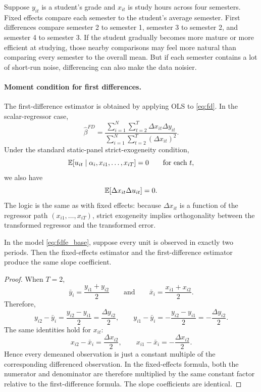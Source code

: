 \begin{exmp}
\label{ex:fd_fe_intuition}
Suppose $y_{it}$ is a student's grade and $x_{it}$ is study hours across four semesters. Fixed effects compare each semester to the student's average semester. First differences compare semester 2 to semester 1, semester 3 to semester 2, and semester 4 to semester 3. If the student gradually becomes more mature or more efficient at studying, those nearby comparisons may feel more natural than comparing every semester to the overall mean. But if each semester contains a lot of short-run noise, differencing can also make the data noisier.
\end{exmp}

\paragraph{Moment condition for first differences.}
The first-difference estimator is obtained by applying \ac{OLS} to \eqref{eq:fd}. In the scalar-regressor case,
\begin{equation}
\hat{\beta}^{FD}
=
\frac{\sum_{i=1}^N \sum_{t=2}^T \Delta x_{it}\Delta y_{it}}
{\sum_{i=1}^N \sum_{t=2}^T (\Delta x_{it})^2}.
\label{eq:fd_estimator}
\end{equation}
Under the standard static-panel strict-exogeneity condition,
\[
\mathbb{E}[u_{it}\mid \alpha_i,x_{i1},\ldots,x_{iT}] = 0
\qquad \text{for each } t,
\]
we also have
\[
\mathbb{E}[\Delta x_{it}\Delta u_{it}] = 0.
\]
The logic is the same as with fixed effects: because $\Delta x_{it}$ is a function of the regressor path $(x_{i1},\ldots,x_{iT})$, strict exogeneity implies orthogonality between the transformed regressor and the transformed error.

\begin{thmN}[Fixed effects and first differences are identical when $T=2$]
In the model \eqref{eq:fdfe_base}, suppose every unit is observed in exactly two periods. Then the fixed-effects estimator and the first-difference estimator produce the same slope coefficient.
\label{thm:fe_fd_t2}
\end{thmN}

\begin{proof}
When $T=2$,
\[
\bar{y}_i = \frac{y_{i1}+y_{i2}}{2}
\qquad \text{and} \qquad
\bar{x}_i = \frac{x_{i1}+x_{i2}}{2}.
\]
Therefore,
\[
y_{i2}-\bar{y}_i = \frac{y_{i2}-y_{i1}}{2}=\frac{\Delta y_{i2}}{2},
\qquad
y_{i1}-\bar{y}_i = -\frac{y_{i2}-y_{i1}}{2}=-\frac{\Delta y_{i2}}{2}.
\]
The same identities hold for $x_{it}$:
\[
x_{i2}-\bar{x}_i = \frac{\Delta x_{i2}}{2},
\qquad
x_{i1}-\bar{x}_i = -\frac{\Delta x_{i2}}{2}.
\]
Hence every demeaned observation is just a constant multiple of the corresponding differenced observation. In the fixed-effects formula, both the numerator and denominator are therefore multiplied by the same constant factor relative to the first-difference formula. The slope coefficients are identical.
\end{proof}


